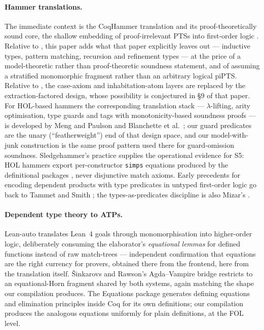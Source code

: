 \paragraph{Hammer translations.}  The immediate context is the
CoqHammer translation \cite{CzajkaKaliszyk2018,CzajkaKaliszyk2016} and
its proof-theoretically sound core, the shallow embedding of
proof-irrelevant PTSs into first-order logic \cite{Czajka2018}.
Relative to \cite{Czajka2018}, this paper adds what that paper
explicitly leaves out --- inductive types, pattern matching, recursion
and refinement types --- at the price of a model-theoretic rather than
proof-theoretic soundness statement, and of assuming a stratified
monomorphic fragment rather than an arbitrary logical piPTS.  Relative
to \cite{CzajkaKaliszyk2018}, the case-axiom and inhabitation-atom
layers are replaced by the extraction-factored design, whose possibility
is conjectured in \S 9 of that paper.  For HOL-based hammers the
corresponding translation stack --- $\lambda$-lifting, arity
optimisation, type guards and tags with monotonicity-based soundness
proofs --- is developed by Meng and Paulson \cite{MengPaulson2008} and
Blanchette et al.\ \cite{BlanchetteEtAl2016}; our guard predicates are
the unary (``featherweight'') end of that design space, and our
model-with-junk construction is the same proof pattern used there for
guard-omission soundness.  Sledgehammer's practice
\cite{PaulsonBlanchette2010,BlanchetteEtAl2016qed} supplies the
operational evidence for S5: HOL hammers export per-constructor
\texttt{simps} equations produced by the definitional packages
\cite{Krauss2010}, never disjunctive match axioms.  Early precedents for
encoding dependent products with type predicates in untyped first-order
logic go back to Tammet and Smith \cite{TammetSmith1998}; the
types-as-predicates discipline is also Mizar's \cite{Wiedijk2007}.

\paragraph{Dependent type theory to ATPs.}  Lean-auto
\cite{QianEtAl2025} translates Lean~4 goals through monomorphisation
into higher-order logic, deliberately consuming the elaborator's
\emph{equational lemmas} for defined functions instead of raw
match-trees --- independent confirmation that equations are the right
currency for provers, obtained there from the frontend, here from the
translation itself.  \v{S}inkarovs and Rawson's Agda--Vampire bridge
\cite{SinkarovsRawson2026} restricts to an equational-Horn fragment
shared by both systems, again matching the shape our compilation
produces.  The Equations package \cite{SozeauMangin2019} generates
defining equations and elimination principles inside Coq for its own
definitions; our compilation produces the analogous equations uniformly
for plain definitions, at the FOL level.

